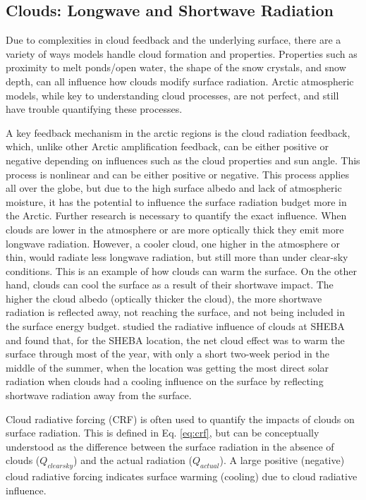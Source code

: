 \subsection{Clouds: Longwave and Shortwave Radiation}

Due to complexities in cloud feedback and the underlying surface, there are a variety of ways models handle cloud formation and properties. Properties such as proximity to melt ponds/open water, the shape of the snow crystals, and snow depth, can all influence how clouds modify surface radiation. Arctic atmospheric models, while key to understanding cloud processes, are not perfect, and still have trouble quantifying these processes. 

A key feedback mechanism in the arctic regions is the cloud radiation feedback, which, unlike other Arctic amplification feedback, can be either positive or negative depending on influences such as the cloud properties and sun angle. This process is nonlinear and can be either positive or negative. This process applies all over the globe, but due to the high surface albedo and lack of atmospheric moisture, it has the potential to influence the surface radiation budget more in the Arctic. Further research is necessary to quantify the exact influence. When clouds are lower in the atmosphere or are more optically thick they emit more longwave radiation. However, a cooler cloud, one higher in the atmosphere or thin, would radiate less longwave radiation, but still more than under clear-sky conditions. This is an example of how clouds can warm the surface. On the other hand, clouds can cool the surface as a result of their shortwave impact. The higher the cloud albedo (optically thicker the cloud), the more shortwave radiation is reflected away, not reaching the surface, and not being included in the surface energy budget. \citet{intrieri:2002} studied the radiative influence of clouds at SHEBA and found that, for the SHEBA location, the net cloud effect was to warm the surface through most of the year, with only a short two-week period in the middle of the summer, when the location was getting the most direct solar radiation when clouds had a cooling influence on the surface by reflecting shortwave radiation away from the surface. 

Cloud radiative forcing (CRF) is often used to quantify the impacts of clouds on surface radiation. This is defined in Eq. \ref{eq:crf}, but can be conceptually understood as the difference between the surface radiation in the absence of clouds ($Q_{clear sky}$) and the actual radiation ($Q_{actual}$). A large positive (negative) cloud radiative forcing indicates surface warming (cooling) due to cloud radiative influence. 

